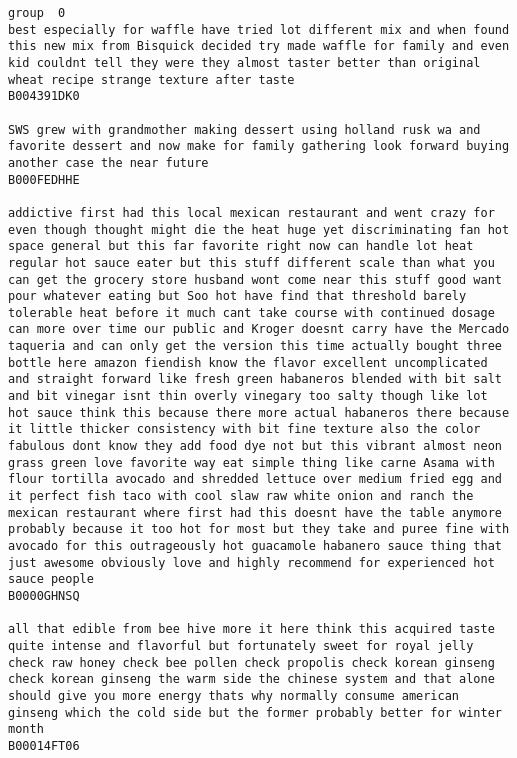 \documentclass[11pt]{article}
\begin{document}
    \begin{Verbatim}[commandchars=\\\{\}]
group  0
best especially for waffle have tried lot different mix and when found this new mix from Bisquick decided try made waffle for family and even kid couldnt tell they were they almost taster better than original wheat recipe strange texture after taste
B004391DK0

SWS grew with grandmother making dessert using holland rusk wa and favorite dessert and now make for family gathering look forward buying another case the near future
B000FEDHHE

addictive first had this local mexican restaurant and went crazy for even though thought might die the heat huge yet discriminating fan hot space general but this far favorite right now can handle lot heat regular hot sauce eater but this stuff different scale than what you can get the grocery store husband wont come near this stuff good want pour whatever eating but Soo hot have find that threshold barely tolerable heat before it much cant take course with continued dosage can more over time our public and Kroger doesnt carry have the Mercado taqueria and can only get the version this time actually bought three bottle here amazon fiendish know the flavor excellent uncomplicated and straight forward like fresh green habaneros blended with bit salt and bit vinegar isnt thin overly vinegary too salty though like lot hot sauce think this because there more actual habaneros there because it little thicker consistency with bit fine texture also the color fabulous dont know they add food dye not but this vibrant almost neon grass green love favorite way eat simple thing like carne Asama with flour tortilla avocado and shredded lettuce over medium fried egg and it perfect fish taco with cool slaw raw white onion and ranch the mexican restaurant where first had this doesnt have the table anymore probably because it too hot for most but they take and puree fine with avocado for this outrageously hot guacamole habanero sauce thing that just awesome obviously love and highly recommend for experienced hot sauce people
B0000GHNSQ

all that edible from bee hive more it here think this acquired taste quite intense and flavorful but fortunately sweet for royal jelly check raw honey check bee pollen check propolis check korean ginseng check korean ginseng the warm side the chinese system and that alone should give you more energy thats why normally consume american ginseng which the cold side but the former probably better for winter month
B00014FT06


\end{Verbatim}
\end{document}
